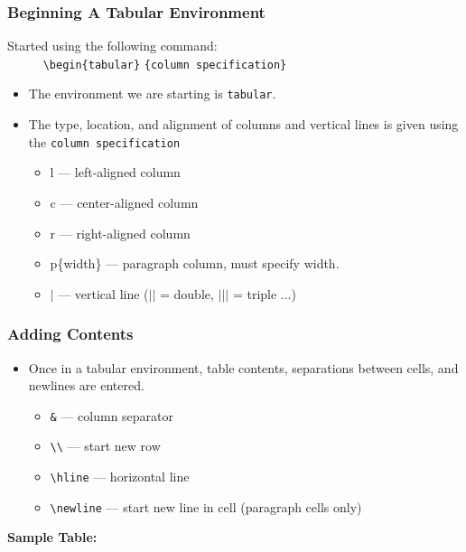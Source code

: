 \documentclass{beamer}
\newcommand{\pc}[1]
{
    \texttt{\textbackslash #1}
}
\newcommand{\pca}[2]
{
    \texttt{\textbackslash #1\{#2\}}
}
\begin{document}
\begin{frame} \frametitle{Beginning A Tabular Environment}
    Started using the following command:\\
    \ \ \ \ \ \pca{begin}{tabular}\texttt{\{column specification\}}\\
    \begin{itemize}
        \item The environment we are starting is \texttt{tabular}.
        \item The type, location, and alignment of columns and vertical lines is given using the \texttt{column specification}
	    \begin{itemize}
	        \item l --- left-aligned column
	        \item c --- center-aligned column
	        \item r --- right-aligned column
	        \item p\{width\} --- paragraph column, must specify width.
	        \item $|$ --- vertical line ($||$ = double, $|||$ = 	triple ...) 
	    \end{itemize}
    \end{itemize}
\end{frame}

\begin{frame} \frametitle{Adding Contents}
    \begin{itemize}
    	\item Once in a tabular environment, table contents, separations between cells, and newlines are entered.\\
    	\begin{itemize}
			\item \texttt{\&} --- column separator
			\item \texttt{\textbackslash\textbackslash} --- start new row
        	\item \pc{hline} --- horizontal line
			\item \pc{newline} --- start new line in cell (paragraph cells only)
		\end{itemize}
    \end{itemize}
    
    \textbf{Sample Table:}
    
\end{frame}
\end{document}

